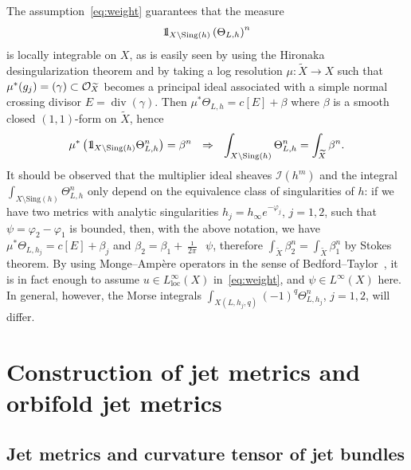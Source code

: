 \documentclass[AHL,Unicode,longabstracts,published]{cedram}
\DeclareMathOperator{\ddbar}{\partial\bar\partial}
\newcommand*\Sing{\mathrm{Sing}}
\newcommand*\loc{\mathrm{loc}}
\newcommand*\cI{\mathcal{I}}
\newcommand*\cO{\mathcal{O}}
\newcommand*\bOne{{\mathchoice {\rm 1\mskip-4mu l} {\rm 1\mskip-4mu l} {\rm 1\mskip-4.5mu l}{\rm 1\mskip-5mu l}}}
\begin{document}
\begin{rema}\label{rema:integrability}
The assumption~\eqref{eq:weight} guarantees that the measure
\[
\bOne_{X\setminus\Sing(h)}\left(\Theta_{L,h}\right)^n
\]
is locally integrable on $X$, as is easily seen by using the Hironaka desingularization theorem and by taking a log resolution $\mu\colon\widetilde X\to X$ such that
$\mu^*(g_j)=(\gamma)\subset \cO_{\smash{\widetilde X}}$ becomes a principal ideal associated with a simple normal crossing divisor
$E=\operatorname{div}(\gamma)$. Then $\mu^*\Theta_{L,h}= c[E]+\beta$ where $\beta$ is a smooth closed
$(1,1)$-form on $\widetilde X$, hence
\[
\mu^*\left(\bOne_{X\setminus\Sing(h)}\Theta_{L,h}^n\right)=\beta^n~~\Rightarrow~~
\int_{X\setminus\Sing(h)}\Theta_{L,h}^n=\int_{\widetilde X}\beta^n.
\]
It should be observed that the multiplier ideal sheaves $\cI(h^m)$ and the integral $\int_{X\setminus\Sing(h)}\Theta_{L,h}^n$ only depend on the equivalence class of singularities of $h$: if we have two metrics with analytic singularities $h_j=h_\infty e^{-\varphi_j}$, $j=1,2$, such that
$\psi=\varphi_2-\varphi_1$ is bounded, then, with the above notation, we have $\mu^*\Theta_{L,h_j}=c[E]+\beta_j$ and $\beta_2=\beta_1+\tfrac{\imath}{ 2\pi}\ddbar\psi$, therefore $\int_{\widetilde X}\beta_2^n=\int_{\widetilde X}\beta_1^n$ by Stokes theorem. By using Monge--Ampère operators in the sense of Bedford--Taylor~\cite{BT76}, it is in fact enough to assume $u\in L^\infty_\loc(X)$ in~\eqref{eq:weight}, and $\psi\in L^\infty(X)$ here. In general, however, the Morse integrals
$\int_{X(L,h_j,q)}(-1)^q\Theta_{L,h_j}^n$, $j=1,2$, will differ.
\end{rema}


\section{Construction of jet metrics and orbifold jet metrics}\label{se:jet_metrics}
\subsection{Jet metrics and curvature tensor of jet bundles}\label{sse:jet_metrics}
\end{document}
